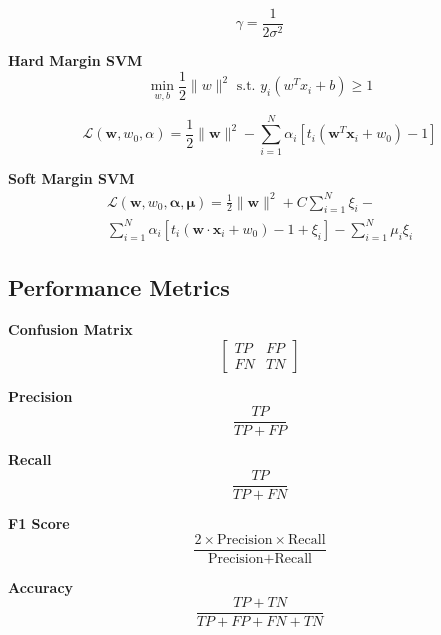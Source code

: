 \documentclass[10pt]{article}
\begin{document}
\begin{multicols}{2}
\begin{equation}
    \gamma = \frac{1}{2\sigma^2}
\end{equation}

\textbf{Hard Margin SVM}
\begin{equation}
    \min_{w, b} \frac{1}{2} \|w\|^2 \text{ s.t. } y_i(w^Tx_i + b) \geq 1
\end{equation}

\begin{equation}
    \mathcal{L}(\mathbf{w}, w_0, \alpha) = \frac{1}{2} \|\mathbf{w}\|^2 - \sum_{i=1}^{N} \alpha_i[t_i(\mathbf{w}^T\mathbf{x}_i + w_0) - 1]
\end{equation}

\textbf{Soft Margin SVM}
\begin{multline}
    \mathcal{L}(\mathbf{w}, w_0, \mathbf{\alpha}, \mathbf{\mu}) = \frac{1}{2} \|\mathbf{w}\|^2 + C \sum_{i=1}^{N} \xi_i - \\
    \sum_{i=1}^{N} \alpha_i[t_i(\mathbf{w} \cdot \mathbf{x}_i + w_0) - 1 + \xi_i] - \sum_{i=1}^{N} \mu_i \xi_i
\end{multline}

\subsection*{Performance Metrics}
\textbf{Confusion Matrix}
\begin{equation}
    \begin{bmatrix}
        TP & FP \\
        FN & TN
    \end{bmatrix}
\end{equation}

\textbf{Precision}
\begin{equation}
    \frac{TP}{TP + FP}
\end{equation}

\textbf{Recall}
\begin{equation}
    \frac{TP}{TP + FN}
\end{equation}

\textbf{F1 Score}
\begin{equation}
    \frac{2 \times \text{Precision} \times \text{Recall}}{\text{Precision} + \text{Recall}}
\end{equation}

\textbf{Accuracy}
\begin{equation}
    \frac{TP + TN}{TP + FP + FN + TN}
\end{equation}


\end{multicols}
\end{document}
